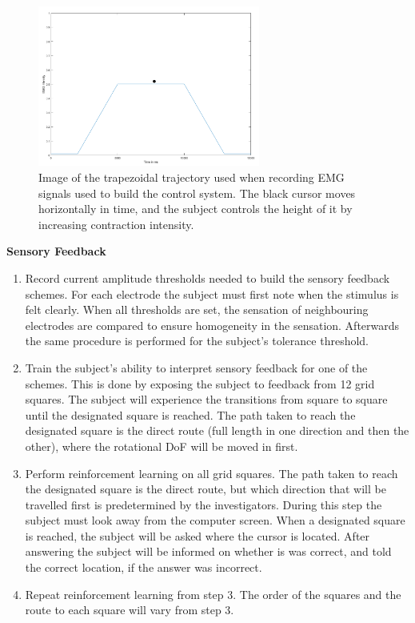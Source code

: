 \begin{figure}[H]                 
	\includegraphics[width=0.65\textwidth]{figures/trapezoid2}  
	\caption{Image of the trapezoidal trajectory used when recording EMG signals used to build the control system. The black cursor moves horizontally in time, and the subject controls the height of it by increasing contraction intensity.}
	\label{fig:trapezoid} 
\end{figure}

\textbf{Sensory Feedback} \\
\vspace{-25pt}
\begin{enumerate}
	\item Record current amplitude thresholds needed to build the sensory feedback schemes. For each electrode the subject must first note when the stimulus is felt clearly. When all thresholds are set, the sensation of neighbouring electrodes are compared to ensure homogeneity in the sensation. Afterwards the same procedure is performed for the subject's tolerance threshold. 
	\item Train the subject's ability to interpret sensory feedback for one of the schemes. This is done by exposing the subject to feedback from 12 grid squares. The subject will experience the transitions from square to square until the designated square is reached. The path taken to reach the designated square is the direct route (full length in one direction and then the other), where the rotational DoF will be moved in first. 
	\item Perform reinforcement learning on all grid squares. The path taken to reach the designated square is the direct route, but which direction that will be travelled first is predetermined by the investigators. During this step the subject must look away from the computer screen. When a designated square is reached, the subject will be asked where the cursor is located. After answering the subject will be informed on whether is was correct, and told the correct location, if the answer was incorrect. 
	\item Repeat reinforcement learning from step 3. The order of the squares and the route to each square will vary from step 3.
\end{enumerate}

